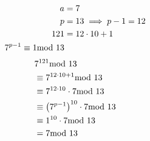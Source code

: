 \documentclass{article}
\begin{document}
\begin{align*}
	a   & = 7                      \\
	p   & = 13 \implies p - 1 = 12 \\
	121 & = 12 \cdot 10 + 1        \\
	7^{p - 1} \equiv 1 \text{mod } 13
\end{align*}
\begin{align*}
	 & 7^{121} \text{mod } 13                                      \\
	 & \equiv 7^{12 \cdot 10 + 1} \text{mod } 13                   \\
	 & \equiv 7^{12 \cdot 10} \cdot 7 \text{mod } 13               \\
	 & \equiv \left( 7^{p - 1} \right)^{10} \cdot 7 \text{mod } 13 \\
	 & \equiv 1^{10} \cdot 7 \text{mod } 13                        \\
	 & = 7 \text{mod } 13
\end{align*}
\end{document}

